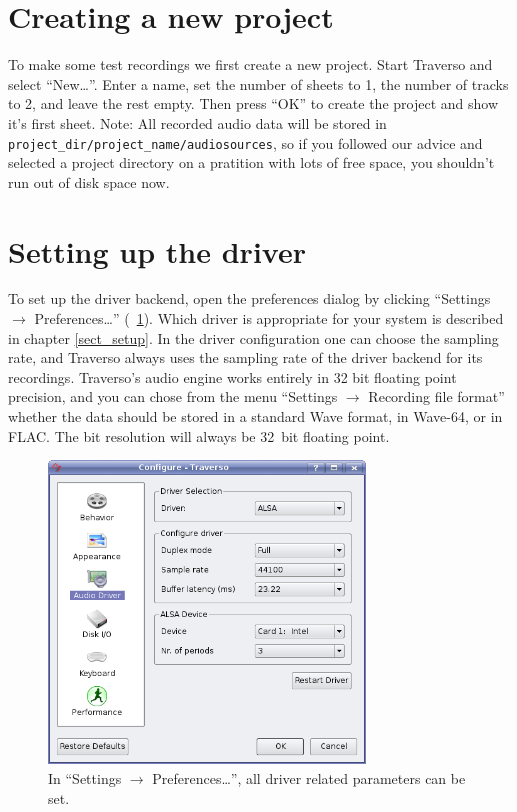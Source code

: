 \section{Creating a new project}
To make some test recordings we first create a new project. Start Traverso and select ``New\dots''. Enter a name, set the number of sheets to 1, the number of tracks to 2, and leave the rest empty. Then press ``OK'' to create the project and show it's first sheet. Note: All recorded audio data will be stored in \texttt{project\_dir/project\_name/audiosources}, so if you followed our advice and selected a project directory on a pratition with lots of free space, you shouldn't run out of disk space now.

\section{Setting up the driver}
To set up the driver backend, open the preferences dialog by clicking ``Settings $\rightarrow$ Preferences\dots'' (\FigB\ \ref{fig_driversettings}). Which driver is appropriate for your system is described in chapter \ref{sect_setup}. In the driver configuration one can choose the sampling rate, and Traverso always uses the sampling rate of the driver backend for its recordings. Traverso's audio engine works entirely in 32 bit floating point precision, and you can chose from the menu ``Settings $\rightarrow$ Recording file format'' whether the data should be stored in a standard Wave format, in Wave-64, or in FLAC. The bit resolution will always be 32~bit floating point.

\begin{figure}
 \centering\includegraphics[width=0.75\textwidth]{images/driversettings.png}
 \caption{In ``Settings $\rightarrow$ Preferences\dots'', all driver related parameters can be set.}
 \label{fig_driversettings}
\end{figure}

